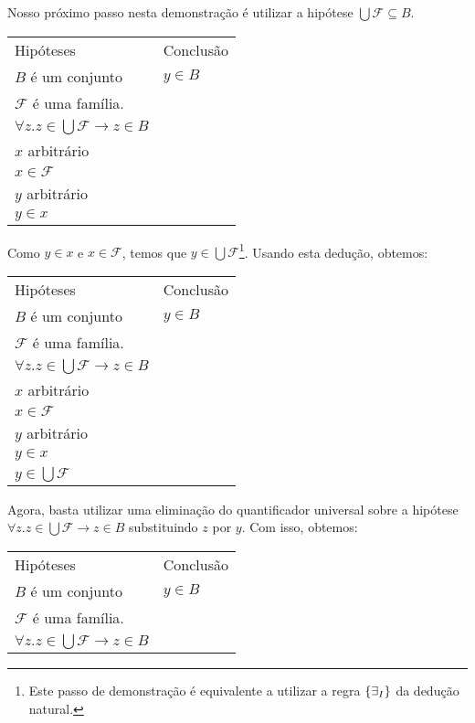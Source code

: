 \begin{Example}
\begin{flushleft}
\begin{tabular}{ll}
\end{tabular}
\end{flushleft}
Nosso próximo passo nesta demonstração é utilizar a hipótese $\bigcup
\mathcal{F} \subseteq B$.
\begin{flushleft}
\begin{tabular}{ll}
Hipóteses & Conclusão \\
$B$ é um conjunto & $ y \in B$ \\
$\mathcal{F}$ é uma família. & \\
$\forall z. z\in \bigcup \mathcal{F} \to z\in B$ & \\
$x$ arbitrário & \\
$x\in\mathcal{F}$ & \\
$y$ arbitrário & \\
$y\in x$ & \\
\end{tabular}
\end{flushleft}
Como $y\in x$ e $x\in\mathcal{F}$, temos que $y \in \bigcup
\mathcal{F}$\footnote{Este passo de demonstração é equivalente a
  utilizar a regra $\scriptsize{\{\exists_I}\}$ da dedução natural.}. Usando esta
dedução, obtemos:
\begin{flushleft}
\begin{tabular}{ll}
Hipóteses & Conclusão \\
$B$ é um conjunto & $ y \in B$ \\
$\mathcal{F}$ é uma família. & \\
$\forall z. z\in \bigcup \mathcal{F} \to z\in B$ & \\
$x$ arbitrário & \\
$x\in\mathcal{F}$ & \\
$y$ arbitrário & \\
$y\in x$ & \\
$y\in\bigcup\mathcal{F}$ &\\
\end{tabular}
\end{flushleft}
Agora, basta utilizar uma eliminação do quantificador universal sobre
a hipótese $\forall z. z\in \bigcup \mathcal{F} \to z\in B$
substituindo $z$ por $y$. Com isso, obtemos:
\begin{flushleft}
\begin{tabular}{ll}
Hipóteses & Conclusão \\
$B$ é um conjunto & $ y \in B$ \\
$\mathcal{F}$ é uma família. & \\
$\forall z. z\in \bigcup \mathcal{F} \to z\in B$ & \\

\end{tabular}
\end{flushleft}
\end{Example}
